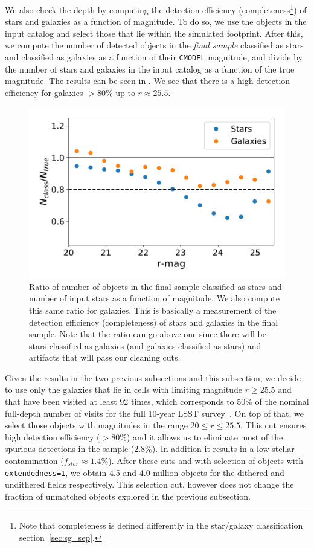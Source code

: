 \documentclass[a4paper,fleqn,usenatbib]{mnras}
\begin{document}
We also check the depth by computing the detection efficiency (completeness\footnote{Note that completeness is defined differently in the star/galaxy classification section~\ref{sec:sg_sep}.}) of stars and galaxies as a function of magnitude. To do so, we use the objects in the input catalog and select those that lie within the simulated footprint. After this, we compute the number of detected objects in the \textit{final sample} classified as stars and classified as galaxies as a function of their \texttt{CMODEL} magnitude, and divide by the number of stars and galaxies in the input catalog as a function of the true magnitude. The results can be seen in . We see that there is a high detection efficiency for galaxies $> 80\%$ up to $r \approx 25.5$.  

\begin{figure}
\centering
\includegraphics[width=0.9\columnwidth]{stellar_detection_efficiency.pdf}
\caption{Ratio of number of objects in the final sample classified as stars and number of input stars as a function of magnitude. We also compute this same ratio for galaxies. This is basically a measurement of the detection efficiency (completeness) of stars and galaxies in the final sample. Note that the ratio can go above one since there will be stars classified as galaxies (and galaxies classified as stars) and artifacts that will pass our cleaning cuts.}
\label{fig:stellar_detection_efficiency}
\end{figure}

Given the results in the two previous subsections and this subsection, we decide to use only the galaxies that lie in cells with limiting magnitude $r \geq 25.5$ and that have been visited at least 92 times, which corresponds to 50\% of the nominal full-depth number of visits for the full 10-year LSST survey~\citep{Overview}. On top of that, we select those objects with magnitudes in the range $20 \leq r \leq 25.5$. This cut ensures high detection efficiency ($>80\%$) and it allows us to eliminate most of the spurious detections in the sample (2.8\%). In addition it results in a low stellar contamination ($f_{star} \approx 1.4\%$). After these cuts and with selection of objects with \texttt{extendedness=1}, we obtain 4.5 and 4.0 million objects for the dithered and undithered fields respectively. This selection cut, however does not change the fraction of unmatched objects explored in the previous subsection.
\end{document}
